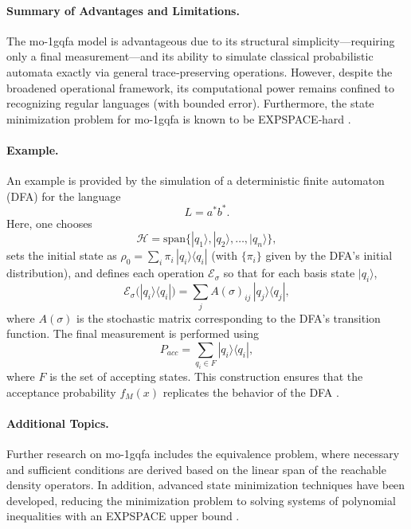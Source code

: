\paragraph{Summary of Advantages and Limitations.}  
The \gls{mo-1gqfa} model is advantageous due to its structural simplicity—requiring only a final measurement—and its ability to simulate classical probabilistic automata exactly via general trace‐preserving operations. However, despite the broadened operational framework, its computational power remains confined to recognizing regular languages (with bounded error). Furthermore, the state minimization problem for \gls{mo-1gqfa} is known to be EXPSPACE‐hard \cite{MATEUS201236}.

\paragraph{Example.}  
An example is provided by the simulation of a deterministic finite automaton (DFA) for the language
\[
L=a^*b^*.
\]
Here, one chooses 
\[
\mathcal{H}=\mathrm{span}\{|q_1\rangle,|q_2\rangle,\dots,|q_n\rangle\},
\]
sets the initial state as $\rho_0=\sum_{i}\pi_i\,|q_i\rangle\langle q_i|$ (with $\{\pi_i\}$ given by the DFA’s initial distribution), and defines each operation $\mathcal{E}_\sigma$ so that for each basis state $|q_i\rangle$,
\[
\mathcal{E}_\sigma\bigl(|q_i\rangle\langle q_i|\bigr)=\sum_{j}A(\sigma)_{ij}\,|q_j\rangle\langle q_j|,
\]
where $A(\sigma)$ is the stochastic matrix corresponding to the DFA's transition function. The final measurement is performed using 
\[
P_{acc}=\sum_{q_i\in F}|q_i\rangle\langle q_i|,
\]
where $F$ is the set of accepting states. This construction ensures that the acceptance probability $f_M(x)$ replicates the behavior of the DFA \cite{LI201273}.

\paragraph{Additional Topics.}  
Further research on \gls{mo-1gqfa} includes the equivalence problem, where necessary and sufficient conditions are derived based on the linear span of the reachable density operators. In addition, advanced state minimization techniques have been developed, reducing the minimization problem to solving systems of polynomial inequalities with an EXPSPACE upper bound \cite{10.1007/978-3-540-88282-4_34}.

\subsubsection{}
